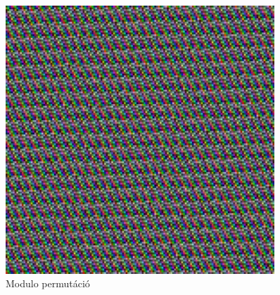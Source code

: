 \documentclass[
    parspace,
    noindent,
    nohyp,
]{elteiktdk}[2023/04/10]
\begin{document}
\begin{figure}[H]
\begin{minipage}[b]{0.45\textwidth}
    \includegraphics[width=0.9\textwidth]{image/permutation-mp1.png}
    \caption{Modulo permutáció}
  \end{minipage}
  \hspace*{\fill}
  
  \vspace*{0.7cm}
  

\end{figure}
\end{document}
